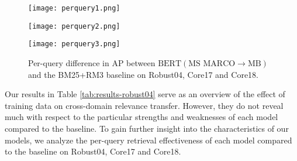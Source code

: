 \begin{figure}[t!]
	\centering
    \begin{minipage}{0.3\textwidth}
        \centering
        \texttt{[image: perquery1.png]}
    \end{minipage}\hfill
    \begin{minipage}{0.3\textwidth}
        \centering
        \texttt{[image: perquery2.png]}
    \end{minipage}\hfill
    \begin{minipage}{0.3\textwidth}
        \centering
        \texttt{[image: perquery3.png]}
    \end{minipage}
\caption{Per-query difference in AP between $ \textrm{BERT}(\textrm{MS MARCO}\rightarrow\textrm{MB}) $ and the BM25+RM3 baseline on Robust04, Core17 and Core18.}
\label{fig:perquery-msmarcomb}
\end{figure}


Our results in Table \ref{tab:results-robust04} serve as an overview of the effect of training data on cross-domain relevance transfer.
However, they do not reveal much with respect to the particular strengths and weaknesses of each model compared to the baseline.
To gain further insight into the characteristics of our models, we analyze the per-query retrieval effectiveness of each model compared to the baseline on Robust04, Core17 and Core18.

